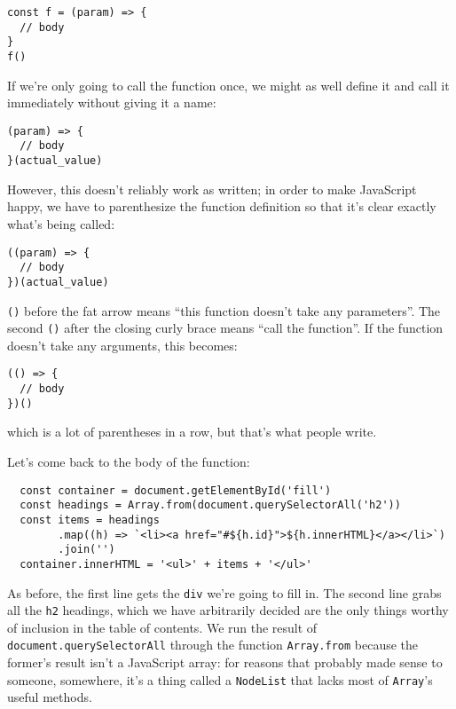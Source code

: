 \begin{verbatim}
const f = (param) => {
  // body
}
f()
\end{verbatim}

If we're only going to call the function once,
we might as well define it and call it immediately without giving it a name:

\begin{verbatim}
(param) => {
  // body
}(actual_value)
\end{verbatim}

However,
this doesn't reliably work as written;
in order to make JavaScript happy,
we have to parenthesize the function definition
so that it's clear exactly what's being called:

\begin{verbatim}
((param) => {
  // body
})(actual_value)
\end{verbatim}

\texttt{()} before the fat arrow means ``this function doesn't take any parameters''.
The second \texttt{()} after the closing curly brace means ``call the function''.
If the function doesn't take any arguments,
this becomes:

\begin{verbatim}
(() => {
  // body
})()
\end{verbatim}

\noindent
which is a lot of parentheses in a row,
but that's what people write.

Let's come back to the body of the function:

\begin{verbatim}
  const container = document.getElementById('fill')
  const headings = Array.from(document.querySelectorAll('h2'))
  const items = headings
        .map((h) => `<li><a href="#${h.id}">${h.innerHTML}</a></li>`)
        .join('')
  container.innerHTML = '<ul>' + items + '</ul>'
\end{verbatim}

As before,
the first line gets the \texttt{div} we're going to fill in.
The second line grabs all the \texttt{h2} headings,
which we have arbitrarily decided are the only things worthy of inclusion
in the table of contents.
We run the result of \texttt{document.querySelectorAll}
through the function \texttt{Array.from}
because the former's result isn't a JavaScript array:
for reasons that probably made sense to someone, somewhere,
it's a thing called a \texttt{NodeList}
that lacks most of \texttt{Array}'s useful methods.

